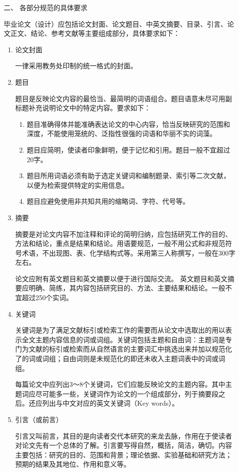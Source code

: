 \begin{itemize}[font=\cusong]
\item[二、]{\cusong 各部分规范的具体要求}\par
毕业论文（设计）应包括论文封面、论文题目、中英文摘要、目录、引言、论文正文、结论、参考文献等主要组成部分，具体要求如下：
\begin{enumerate}[label=\bfseries\arabic*.]
\item {\cusong 论文封面}\par
 \CTEXindent 一律采用教务处印制的统一格式的封面。
\item {\cusong 题目}\par
题目是反映论文内容的最恰当、最简明的词语组合。题目语意未尽可用副标题补充说明论文中的特定内容。要求如下：
\begin{enumerate}[label=(\arabic* )]%
\item 题目准确得体并能准确表达论文的中心内容，恰当反映研究的范围和深度，不能使用笼统的、泛指性很强的词语和华丽不实的词藻。
\item 题目应简明，使读者印象鲜明，便于记忆和引用。题目一般不宜超过20字。
\item 题目所用词语必须有助于选定关键词和编制题录、索引等二次文献，以便为检索提供特定的实用信息。
\item 题目应避免使用非共知共用的缩略词、字符、代号等。
\end{enumerate}
\item {\cusong 摘要}\par
摘要是对论文内容不加注释和评论的简明归纳，应包括研究工作的目的、方法和结论，重点是结果和结论。用语要规范，一般不用公式和非规范符号术语，不出现图、表、化学结构式等。采用第三人称撰写，一般在300字左右。\par
论文应附有英文题目和英文摘要以便于进行国际交流。 英文题目和英文摘要应明确、简练，其内容包括研究目的、方法、主要结果和结论。一般不宜超过250个实词。
\item {\cusong 关键词}\par
关键词是为了满足文献标引或检索工作的需要而从论文中选取出的用以表示全文主题内容信息的词或词组。关键词包括主题和自由词：主题词是专门为文献的标引或检索而从自然语言的主要词汇中挑选出来并加以规范化了的词或词组；自由词则是未规范化的即还未收入主题词表中的词或词组。\par
每篇论文中应列出3～8个关键词，它们应能反映论文的主题内容。其中主题词应尽可能多一些，关键词作为论文的一个组成部分，列于摘要段之后。还应列出与中文对应的英文关键词（Key words）。
\item {\cusong 引言（或前言）}\par
引言又叫前言，其目的是向读者交代本研究的来龙去脉，作用在于使读者对论文先有一个总体的了解。引言要写得自然，概括，简洁，确切。内容主要包括：研究的目的、范围和背景；理论依据、实验基础和研究方法；预期的结果及其地位、作用和意义等。

\end{enumerate}
\end{itemize}
